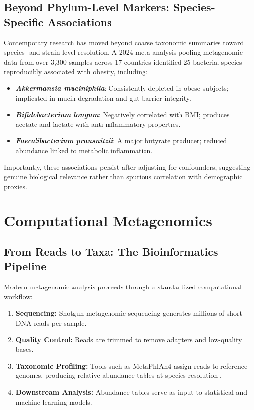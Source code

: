 \subsection{Beyond Phylum-Level Markers: Species-Specific Associations}

Contemporary research has moved beyond coarse taxonomic summaries toward species- and strain-level resolution. A 2024 meta-analysis pooling metagenomic data from over 3,300 samples across 17 countries identified 25 bacterial species reproducibly associated with obesity, including:\cite{NIHMBMI2024}

\begin{itemize}
    \item \textbf{\emph{Akkermansia muciniphila}}: Consistently depleted in obese subjects; implicated in mucin degradation and gut barrier integrity.
    \item \textbf{\emph{Bifidobacterium longum}}: Negatively correlated with BMI; produces acetate and lactate with anti-inflammatory properties.
    \item \textbf{\emph{Faecalibacterium prausnitzii}}: A major butyrate producer; reduced abundance linked to metabolic inflammation.
\end{itemize}

Importantly, these associations persist after adjusting for confounders, suggesting genuine biological relevance rather than spurious correlation with demographic proxies.

\section{Computational Metagenomics}

\subsection{From Reads to Taxa: The Bioinformatics Pipeline}

Modern metagenomic analysis proceeds through a standardized computational workflow:

\begin{enumerate}
    \item \textbf{Sequencing:} Shotgun metagenomic sequencing generates millions of short DNA reads per sample.
    \item \textbf{Quality Control:} Reads are trimmed to remove adapters and low-quality bases.
    \item \textbf{Taxonomic Profiling:} Tools such as MetaPhlAn4 assign reads to reference genomes, producing relative abundance tables at species resolution \cite{blanco2023metaphlan4}.
    \item \textbf{Downstream Analysis:} Abundance tables serve as input to statistical and machine learning models.
\end{enumerate}

